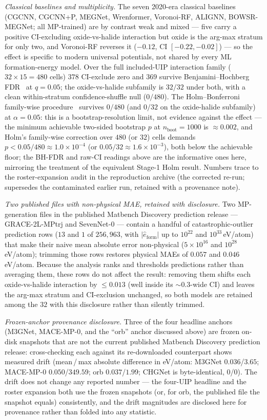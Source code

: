 \documentclass[11pt]{article}
\begin{document}
\emph{Classical baselines and multiplicity.} The seven 2020-era classical baselines (CGCNN,
CGCNN+P, MEGNet, Wrenformer, Voronoi-RF, ALIGNN, BOWSR-MEGNet; all MP-trained) are by contrast weak
and mixed --- five carry a positive CI-excluding oxide-vs-halide interaction but oxide is the
arg-max stratum for only two, and Voronoi-RF reverses it ($-0.12$, CI $[-0.22, -0.02]$) ---
so the effect is specific to modern universal potentials, not shared by every ML formation-energy
model. Over the full included-UIP interaction family ($32 \times 15 = 480$ cells) $378$ CI-exclude
zero and $369$ survive Benjamini--Hochberg FDR~\citep{benjamini1995fdr} at $q = 0.05$; the
oxide-vs-halide subfamily is $32/32$ under both, with a clean within-stratum confidence-shuffle
null ($0/480$). The Holm--Bonferroni family-wise procedure~\citep{holm1979}
survives $0/480$ (and $0/32$ on the oxide-halide subfamily) at $\alpha = 0.05$: this is a
bootstrap-resolution limit, not evidence against the effect --- the minimum achievable two-sided
bootstrap $p$ at $n_{\mathrm{boot}} = 1000$ is $\approx\!0.002$, and Holm's family-wise correction
over $480$ (or $32$) cells demands $p < 0.05/480 \approx 1.0\times10^{-4}$ (or $0.05/32
\approx 1.6\times10^{-3}$), both below the achievable floor; the BH-FDR and raw-CI readings above
are the informative ones here, mirroring the treatment of the equivalent Stage-1 Holm result.
Numbers trace to
the roster-expansion audit in the reproduction archive
(the corrected re-run; supersedes the contaminated
earlier run, retained with a provenance note).

\emph{Two published files with non-physical MAE, retained with disclosure.} Two MP-generation files
in the published Matbench Discovery prediction release --- GRACE-2L-MPtrj and SevenNet-0 --- contain a handful of
catastrophic-outlier prediction rows ($13$ and $1$ of $256{,}963$, with $|\hat{e}_{\mathrm{form}}|$
up to $10^{22}$ and $10^{33}$\,eV/atom) that make their naive mean absolute error
non-physical ($5\times10^{16}$ and $10^{28}$\,eV/atom); trimming those rows restores physical MAEs
of $0.057$ and $0.046$\,eV/atom. Because the analysis ranks and thresholds predictions rather than
averaging them, these rows do not affect the result: removing them shifts each oxide-vs-halide
interaction by $\le\!0.013$ (well inside its $\sim\!0.3$-wide CI) and leaves the arg-max stratum and
CI-exclusion unchanged, so both models are retained among the $32$ with this disclosure rather than
silently trimmed.

\emph{Frozen-anchor provenance disclosure.} Three of the four headline anchors (M3GNet, MACE-MP-0,
and the ``orb'' anchor discussed above) are frozen on-disk snapshots that are not the
current published Matbench Discovery prediction release: cross-checking each against its re-downloaded counterpart
shows measured drift (mean\,/\,max absolute difference in eV/atom: M3GNet $0.036$/$3.65$;
MACE-MP-0 $0.050$/$349.59$; orb $0.037$/$1.99$; CHGNet is byte-identical, $0$/$0$). The drift does
not change any reported number --- the four-UIP headline and the roster expansion both use the
frozen snapshots (or, for orb, the published file the snapshot equals) consistently, and the drift
magnitudes are disclosed here for provenance rather than folded into any statistic.
\end{document}
